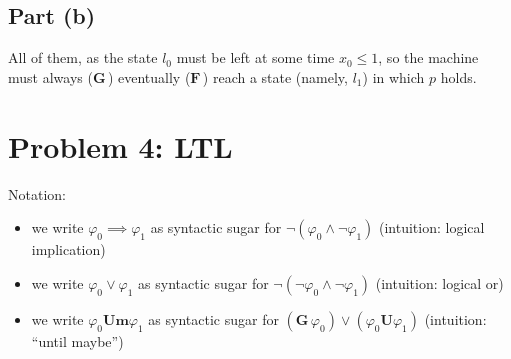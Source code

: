 \documentclass[a4paper,parskip,headheight=38pt]{scrartcl} %
\newcommand{\ltlbinop}[1]{\mathbin{\ensuremath{\mathbf{{#1}}}}}
\newcommand{\ltlunop}[1]{\mathopen{\ensuremath{\mathbf{{#1}}}}\,}
\newcommand{\ltlG}{\ltlunop{G}}
\newcommand{\ltlF}{\ltlunop{F}}
\newcommand{\ltlU}{\ltlbinop{U}}
\newcommand{\ltlUm}{\ltlbinop{Um}}
\begin{document}
\subsection*{Part (b)}

All of them, as the state $l_0$ must be left at some time $x_0 \leq 1$,
so the machine must always ($\ltlG{}$) eventually ($\ltlF{}$) reach a
state (namely, $l_1$) in which $p$ holds.

\section*{Problem 4: LTL}

Notation:
\begin{itemize}
    \item we write $\varphi_0 \implies \varphi_1$ as syntactic sugar for $\neg(\varphi_0 \land \neg \varphi_1)$ (intuition: logical implication)
    \item we write $\varphi_0 \lor \varphi_1$ as syntactic sugar for $\neg(\neg\varphi_0 \land \neg\varphi_1)$ (intuition: logical or)
    \item we write $\varphi_0 \ltlUm \varphi_1$ as syntactic sugar for $(\ltlG{} \varphi_0) \lor (\varphi_0 \ltlU \varphi_1)$ (intuition: \enquote{until maybe})
\end{itemize}
\end{document}
